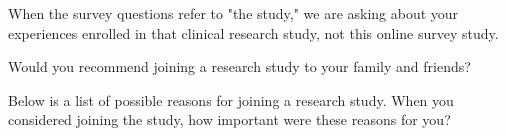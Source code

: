 \documentclass[english,pagemark,stamp,oneside,print_questionnaire_id]{sdapsclassic}
\begin{document}
\begin{questionnaire}
\begin{Form}
\begin{info}
When the survey questions refer to "the study," we are asking about your experiences enrolled in that clinical research study, not this online survey study.
                        \end{info}
                        \begin{optionquestion}[singlechoice,cols=1]{Would you recommend joining a research study to your family and friends?}\end{optionquestion}
                           \begin{optiongroup}{Below is a list of possible reasons for joining a research study. When you considered joining the study, how important were these reasons for you?}
                        
                            
                            
                            
                            
                    
                    
                    
                    
                    
                    
                    
                    
                    

\end{optiongroup}
\end{Form}
\end{questionnaire}
\end{document}
